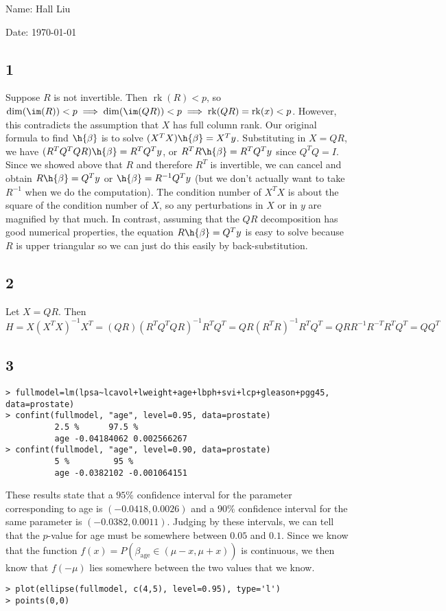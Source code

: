\documentclass{article}
\DeclareMathOperator{\rk}{rk}
\begin{document}
Name: Hall Liu

Date: \today 
\vspace{1.5cm}

\subsection*{1}
Suppose $R$ is not invertible. Then $\rk(R)<p$, so $\dim(\im(R))<p\implies\dim(\im(QR))<p\implies\rk(QR)=\rk(x)<p$. However, this contradicts the assumption that $X$ has full column rank.
Our original formula to find $\h{\beta}$ is to solve $(X^TX)\h{\beta}=X^Ty$. Substituting in $X=QR$, we have $(R^TQ^TQR)\h{\beta}=R^TQ^Ty$, or $R^TR\h{\beta}=R^TQ^Ty$ since $Q^TQ=I$. Since we showed above that $R$ and therefore $R^T$ is invertible, we can cancel and obtain $R\h{\beta}=Q^Ty$ or $\h{\beta}=R^{-1}Q^Ty$ (but we don't actually want to take $R^{-1}$ when we do the computation).
The condition number of $X^TX$ is about the square of the condition number of $X$, so any perturbations in $X$ or in $y$ are magnified by that much. In contrast, assuming that the $QR$ decomposition has good numerical properties, the equation $R\h{\beta}=Q^Ty$ is easy to solve because $R$ is upper triangular so we can just do this easily by back-substitution. 
\subsection*{2}
Let $X=QR$. Then $H=X(X^TX)^{-1}X^T=(QR)(R^TQ^TQR)^{-1}R^TQ^T=QR(R^TR)^{-1}R^TQ^T=QRR^{-1}R^{-T}R^TQ^T=QQ^T$
\subsection*{3}
\begin{verbatim}
> fullmodel=lm(lpsa~lcavol+lweight+age+lbph+svi+lcp+gleason+pgg45, data=prostate)
> confint(fullmodel, "age", level=0.95, data=prostate)
          2.5 %      97.5 %
          age -0.04184062 0.002566267
> confint(fullmodel, "age", level=0.90, data=prostate)
          5 %         95 %
          age -0.0382102 -0.001064151
\end{verbatim}
These results state that a $95\%$ confidence interval for the parameter corresponding to age is $(-0.0418, 0.0026)$ and a $90\%$ confidence interval for the same parameter is $(-0.0382,0.0011)$. Judging by these intervals, we can tell that the $p$-value for age must be somewhere between $0.05$ and $0.1$. Since we know that the function $f(x)=P(\beta_\text{age}\in(\mu-x, \mu+x))$ is continuous, we then know that $f(-\mu)$ lies somewhere between the two values that we know.
\begin{verbatim}
> plot(ellipse(fullmodel, c(4,5), level=0.95), type='l')
> points(0,0)
\end{verbatim}
\end{document}
